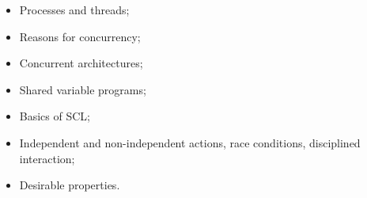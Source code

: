 \documentclass[notes,color]{sepslide0}
\begin{document}
\begin{slide}

\begin{itemize}
\item
Processes and threads;

\item
Reasons for concurrency;

\item
Concurrent architectures;

\item
Shared variable programs; 

\item
Basics of SCL;

\item
Independent and non-independent actions, race conditions, disciplined
interaction; 


\item
Desirable properties.
\end{itemize}
\end{slide}
\end{document}
